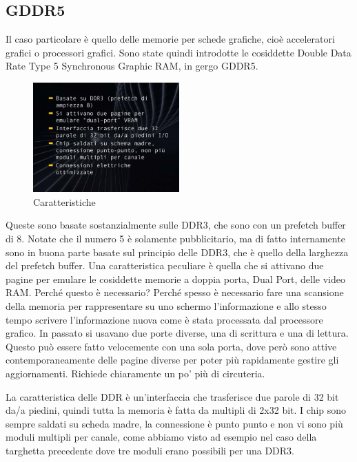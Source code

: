 \subsection{GDDR5 }

Il caso particolare è quello delle memorie per schede grafiche, cioè acceleratori grafici o processori grafici.
Sono state quindi introdotte le cosiddette Double Data Rate Type 5 Synchronous Graphic RAM, in gergo GDDR5.

\FloatBarrier
\begin{figure}[H]
  \centering
  \includegraphics[width=0.50\textwidth,
                    trim=40 40 40 40, %
                    clip]
                    {images/Lez05_p03_fig_01.png}
  \caption{Caratteristiche}
  \label{fig:Lez05_p03_fig_01}
\end{figure}
\FloatBarrier
\noindent

Queste sono basate sostanzialmente sulle DDR3, che sono con un prefetch buffer di 8.
Notate che il numero 5 è solamente pubblicitario, ma di fatto internamente sono in buona parte basate sul principio delle DDR3, che è quello della larghezza del prefetch buffer.
Una caratteristica peculiare è quella che si attivano due pagine per emulare le cosiddette memorie a doppia porta, Dual Port, delle video RAM. Perché questo è necessario? Perché spesso è necessario fare una scansione della memoria per rappresentare su uno schermo l'informazione e allo stesso tempo scrivere l'informazione nuova come è stata processata dal processore grafico.
In passato si usavano due porte diverse, una di scrittura e una di lettura. Questo può essere fatto velocemente con una sola porta, dove però sono attive contemporaneamente delle pagine diverse per poter più rapidamente gestire gli aggiornamenti.
Richiede chiaramente un po' più di circuteria.

La caratteristica delle DDR è un'interfaccia che trasferisce due parole di 32 bit da/a piedini, quindi tutta la memoria è fatta da multipli di 2x32 bit.
I chip sono sempre saldati su scheda madre, la connessione è punto punto e non vi sono più moduli multipli per canale, come abbiamo visto ad esempio nel caso della targhetta precedente dove tre moduli erano possibili per una DDR3.

